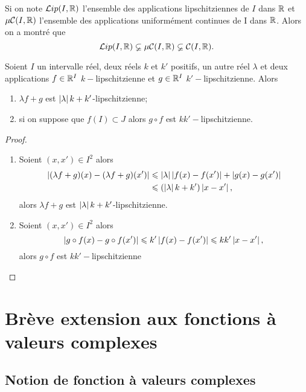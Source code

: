 Si on note \(\mathcal{L}ip(I,\mathbb{R})\) l'ensemble des applications lipschitziennes de \(I\) 
dans \(\mathbb{R}\) et \(\mu\mathcal{C}(I,\mathbb{R})\) l'ensemble des applications uniformément 
continues de I dans \(\mathbb{R}\). Alors on a montré que
\begin{equation}
  \mathcal{L}ip(I,\mathbb{R}) \varsubsetneq \mu\mathcal{C}(I,\mathbb{R}) \varsubsetneq \mathcal{C}(I,\mathbb{R}).
\end{equation}

\begin{prop}
  Soient \(I\) un intervalle réel, deux réels \(k\) et \(k'\) positifs, un autre 
  réel \(\lambda\) et deux applications \(f\in \mathbb{R}^I\) \(k-\)lipschitzienne et 
  \(g\in \mathbb{R}^I\) \(k'-\)lipschitzienne. Alors
  \begin{enumerate}
    \item \(\lambda f+g\) est \(\left\lvert\lambda\right\rvert k+k'\)-lipschitzienne;
    \item si on suppose que \(f(I) \subset J\) alors \(g \circ f\) est 
      \(kk'-\)lipschitzienne.
  \end{enumerate}
\end{prop}
\begin{proof}
  \begin{enumerate}
    \item Soient \((x,x') \in I^2\) alors
      \begin{align}
        \left\lvert(\lambda f+g)(x)-(\lambda f+g)(x')\right\rvert &\leqslant \left\lvert\lambda\right\rvert 
        \left\lvert f(x)-f(x')\right\rvert+\left\lvert g(x)-g(x')\right\rvert\\
        &\leqslant (\left\lvert\lambda\right\rvert k+k')\left\lvert x-x'\right\rvert,
      \end{align}
      alors \(\lambda f+g\) est \(\left\lvert\lambda\right\rvert k+k'\)-lipschitzienne.
    \item Soient \((x,x') \in I^2\) alors
      \begin{equation}
        \left\lvert g \circ f(x)-g \circ f(x')\right\rvert \leqslant k' \left\lvert f(x)-f(x')\right\rvert \leqslant 
        kk' \left\lvert x-x'\right\rvert,
      \end{equation}
      alors \(g \circ f\) est \(kk'-\)lipschitzienne
  \end{enumerate}
\end{proof}

\section[Brève extension aux fonctions complexes]{Brève extension aux fonctions 
à valeurs complexes}

\subsection{Notion de fonction à valeurs complexes}

